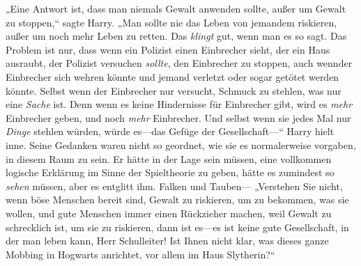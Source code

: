 „Eine Antwort ist, dass man niemals Gewalt anwenden sollte, außer um Gewalt zu stoppen,“ sagte Harry. „Man sollte nie das Leben von jemandem riskieren, außer um noch mehr Leben zu retten. Das \emph{klingt} gut, wenn man es so sagt. Das Problem ist nur, dass wenn ein Polizist einen Einbrecher sieht, der ein Haus ausraubt, der Polizist versuchen \emph{sollte}, den Einbrecher zu stoppen, auch wennder Einbrecher sich wehren könnte und jemand verletzt oder sogar getötet werden könnte. Selbst wenn der Einbrecher nur versucht, Schmuck zu stehlen, was nur eine \emph{Sache} ist. Denn wenn es keine Hindernisse für Einbrecher gibt, wird es \emph{mehr} Einbrecher geben, und noch \emph{mehr} Einbrecher. Und selbst wenn sie jedes Mal nur \emph{Dinge} stehlen würden, würde es—das Gefüge der Gesellschaft—“ Harry hielt inne. Seine Gedanken waren nicht so geordnet, wie sie es normalerweise vorgaben, in diesem Raum zu sein. Er hätte in der Lage sein müssen, eine vollkommen logische Erklärung im Sinne der Spieltheorie zu geben, hätte es zumindest so \emph{sehen} müssen, aber es entglitt ihm. Falken und Tauben— „Verstehen Sie nicht, wenn böse Menschen bereit sind, Gewalt zu riskieren, um zu bekommen, was sie wollen, und gute Menschen immer einen Rückzieher machen, weil Gewalt zu schrecklich ist, um sie zu riskieren, dann ist es—es ist keine gute Gesellschaft, in der man leben kann, Herr Schulleiter! Ist Ihnen nicht klar, was dieses ganze Mobbing in Hogwarts anrichtet, vor allem im Haus Slytherin?“

